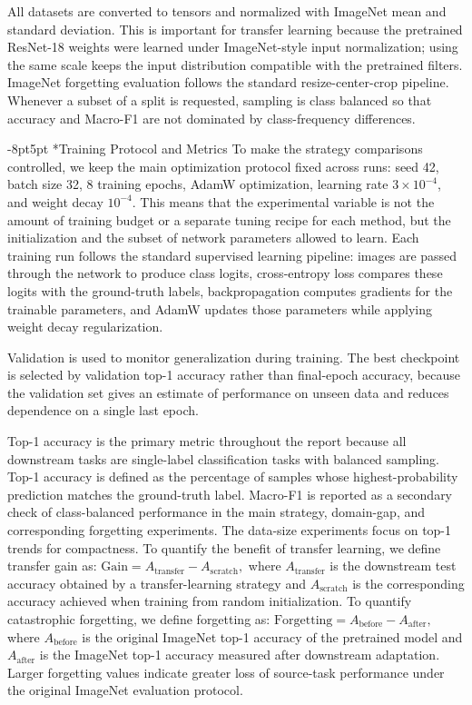 \documentclass[10pt,twocolumn,letterpaper]{article}
\makeatletter
\def\cvprsubsection{\@startsection {subsection}{2}{\z@}
   {-8pt}{5pt} {\normalsize\bfseries}}
\def\cvprssubsect#1{\cvprsubsection*{#1}}
\def\cvprsubsect#1{\cvprsubsection{\texorpdfstring{\hskip -1em.~}{}#1}}
\def\subsection{\@ifstar\cvprssubsect\cvprsubsect}
\makeatother
\begin{document}
All datasets are converted to tensors and normalized with ImageNet mean and standard deviation. This is important for transfer learning because the pretrained ResNet-18 weights were learned under ImageNet-style input normalization; using the same scale keeps the input distribution compatible with the pretrained filters. ImageNet forgetting evaluation follows the standard resize-center-crop pipeline. Whenever a subset of a split is requested, sampling is class balanced so that accuracy and Macro-F1 are not dominated by class-frequency differences.

\subsection{Training Protocol and Metrics}
To make the strategy comparisons controlled, we keep the main optimization protocol fixed across runs: seed 42, batch size 32, 8 training epochs, AdamW optimization, learning rate $3 \times 10^{-4}$, and weight decay $10^{-4}$. This means that the experimental variable is not the amount of training budget or a separate tuning recipe for each method, but the initialization and the subset of network parameters allowed to learn. Each training run follows the standard supervised learning pipeline: images are passed through the network to produce class logits, cross-entropy loss compares these logits with the ground-truth labels, backpropagation computes gradients for the trainable parameters, and AdamW updates those parameters while applying weight decay regularization.

Validation is used to monitor generalization during training. The best checkpoint is selected by validation top-1 accuracy rather than final-epoch accuracy, because the validation set gives an estimate of performance on unseen data and reduces dependence on a single last epoch.

Top-1 accuracy is the primary metric throughout the report because all downstream tasks are single-label classification tasks with balanced sampling. Top-1 accuracy is defined as the percentage of samples whose highest-probability prediction matches the ground-truth label. Macro-F1 is reported as a secondary check of class-balanced performance in the main strategy, domain-gap, and corresponding forgetting experiments. The data-size experiments focus on top-1 trends for compactness. To quantify the benefit of transfer learning, we define transfer gain as:
\( \text{Gain}=A_{\text{transfer}}-A_{\text{scratch}},\)
where $A_{\text{transfer}}$ is the downstream test accuracy obtained by a transfer-learning strategy and $A_{\text{scratch}}$ is the corresponding accuracy achieved when training from random initialization. To quantify catastrophic forgetting, we define forgetting as:
\( \text{Forgetting}=A_{\text{before}}-A_{\text{after}},\)
where $A_{\text{before}}$ is the original ImageNet top-1 accuracy of the pretrained model and $A_{\text{after}}$ is the ImageNet top-1 accuracy measured after downstream adaptation. Larger forgetting values indicate greater loss of source-task performance under the original ImageNet evaluation protocol.
\end{document}
